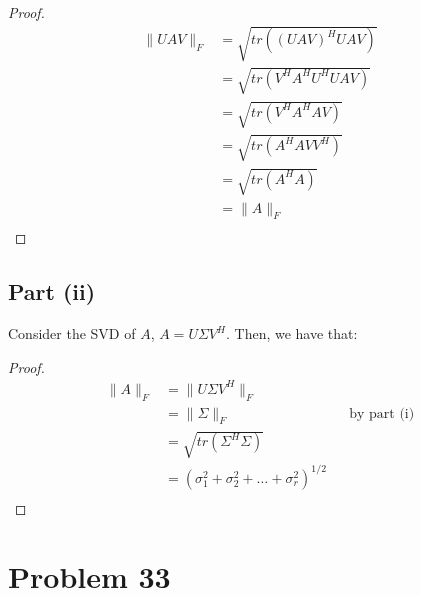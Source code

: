 \documentclass{article}
\begin{document}
\begin{proof}
\begin{align*}
\|UAV\|_F &= \sqrt{tr((UAV)^{H}UAV)} \\
&= \sqrt{tr(V^{H}A^{H}U^{H}UAV)} \\
&= \sqrt{tr(V^{H}A^{H}AV)} \\
&= \sqrt{tr(A^{H}AVV^{H})} \\
&= \sqrt{tr(A^{H}A)} \\
&= \|A\|_F \\
\end{align*}
\end{proof}

\subsection*{Part (ii)}
Consider the SVD of $A$, $A = U\Sigma V^H$. Then, we have that:
\begin{proof}
\begin{align*}
\|A\|_F &= \|U\Sigma V^H\|_F \\
&= \|\Sigma\|_F &&\text{by part (i)} \\
&= \sqrt{tr(\Sigma^{H}\Sigma)} \\
&= (\sigma_1^2 + \sigma_2^2 + \dots + \sigma_r^2)^{1 / 2} \\
\end{align*}
\end{proof}


\section*{Problem 33}
\end{document}
